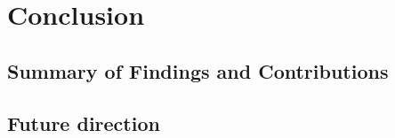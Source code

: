 \chapter{Conclusion}

\section{Summary of Findings and Contributions} 



\section{Future direction} 

